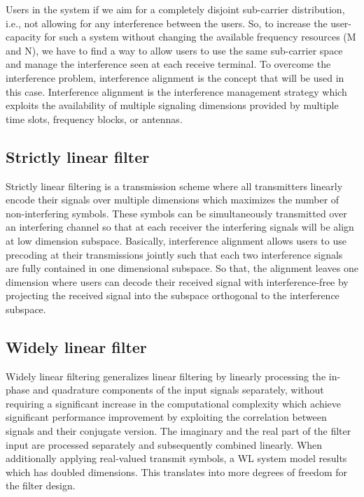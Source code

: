 \documentclass[12pt,a4paper,notitlepage,twoside,headsepline]{scrartcl}
\begin{document}
Users in the system if we aim for a completely disjoint sub-carrier distribution, i.e., not allowing for any interference between the users. So, to increase the user-capacity for such a system without changing the available frequency resources (M and N), we have to find a way to allow users to use the same sub-carrier space and manage the interference seen at each receive terminal. To overcome the interference problem, interference alignment is the concept that will be used in this case. Interference alignment is the interference management strategy which exploits the availability of multiple signaling dimensions provided by multiple time slots, frequency blocks, or antennas. 

\subsection{Strictly linear filter}

Strictly linear filtering is a transmission scheme where all transmitters linearly encode their signals over multiple dimensions which maximizes the number of non-interfering symbols. These symbols can be simultaneously transmitted over an interfering channel so that at each receiver the interfering signals will be align at low dimension subspace. Basically, interference alignment allows users to use precoding at their transmissions jointly such that each two interference signals are fully contained in one dimensional subspace. So that, the alignment leaves one dimension where users can decode their received signal with interference-free by projecting the received signal into the subspace orthogonal to the interference subspace.


\subsection{Widely linear filter}

Widely linear filtering generalizes linear filtering by linearly processing the in-phase and quadrature components of the input signals separately, without requiring a significant increase in the computational complexity which achieve significant performance improvement by exploiting the correlation between signals and their conjugate version. The imaginary and the real part of the filter input are processed separately and subsequently combined linearly. When additionally applying real-valued transmit symbols, a WL system model results which has doubled dimensions. This translates into more degrees of freedom for the filter design.
\end{document}
